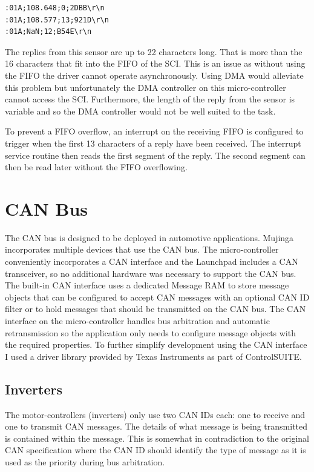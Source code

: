 \begin{verbatim}
:01A;108.648;0;2DBB\r\n
:01A;108.577;13;921D\r\n
:01A;NaN;12;B54E\r\n
\end{verbatim}

The replies from this sensor are up to 22 characters long. That is more than the 16 characters that fit into the FIFO of the SCI. This is an issue as without using the FIFO the driver cannot operate asynchronously. Using DMA would alleviate this problem but unfortunately the DMA controller on this micro-controller cannot access the SCI. Furthermore, the length of the reply from the sensor is variable and so the DMA controller would not be well suited to the task.

To prevent a FIFO overflow, an interrupt on the receiving FIFO is configured to trigger when the first 13 characters of a reply have been received. The interrupt service routine then reads the first segment of the reply. The second segment can then be read later without the FIFO overflowing.

\section{CAN Bus}

The CAN bus is designed to be deployed in automotive applications. Mujinga incorporates multiple devices that use the CAN bus. The micro-controller conveniently incorporates a CAN interface and the Launchpad includes a CAN transceiver, so no additional hardware was necessary to support the CAN bus. The built-in CAN interface uses a dedicated Message RAM to store message objects that can be configured to accept CAN messages with an optional CAN ID filter or to hold messages that should be transmitted on the CAN bus. The CAN interface on the micro-controller handles bus arbitration and automatic retransmission so the application only needs to configure message objects with the required properties. To further simplify development using the CAN interface I used a driver library provided by Texas Instruments as part of ControlSUITE.

\subsection{Inverters}

The motor-controllers (inverters) only use two CAN IDs each: one to receive and one to transmit CAN messages. The details of what message is being transmitted is contained within the message. This is somewhat in contradiction to the original CAN specification where the CAN ID should identify the type of message as it is used as the priority during bus arbitration.

